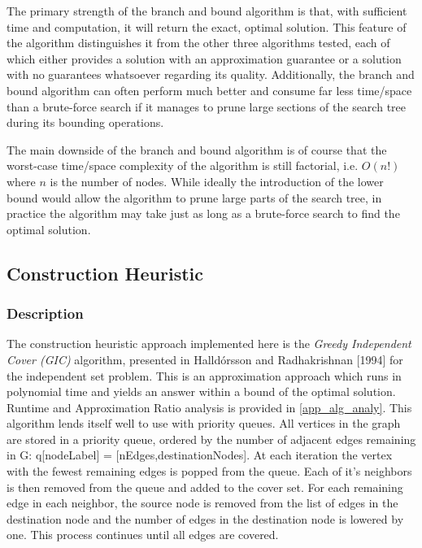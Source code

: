 \documentclass[acmlarge]{acmart}
\begin{document}

The primary strength of the branch and bound algorithm is that, with sufficient time and computation, it will return the exact, optimal solution. This feature of the algorithm distinguishes it from the other three algorithms tested, each of which either provides a solution with an approximation guarantee or a solution with no guarantees whatsoever regarding its quality. Additionally, the branch and bound algorithm can often perform much better and consume far less time/space than a brute-force search if it manages to prune large sections of the search tree during its bounding operations.

The main downside of the branch and bound algorithm is of course that the worst-case time/space complexity of the algorithm is still factorial, i.e. $O(n!)$ where $n$ is the number of nodes. While ideally the introduction of the lower bound would allow the algorithm to prune large parts of the search tree, in practice the algorithm may take just as long as a brute-force search to find the optimal solution.

\subsection{Construction Heuristic}

\subsubsection{Description}

The construction heuristic approach implemented here is the \textit{Greedy Independent Cover (GIC)} algorithm, presented in Halld\'{o}rsson and Radhakrishnan [1994] \cite{Hall97} for the independent set problem. This is an approximation approach which runs in polynomial time and yields an answer within a bound of the optimal solution. Runtime and Approximation Ratio analysis is provided in \ref{app_alg_analy}. This algorithm lends itself well to use with priority queues. All vertices in the graph are stored in a priority queue, ordered by the number of adjacent edges remaining in G: q[nodeLabel] = [nEdges,destinationNodes]. At each iteration the vertex with the fewest remaining edges is popped from the queue. Each of it's neighbors is then removed from the queue and added to the cover set. For each remaining edge in each neighbor, the source node is removed from the list of edges in the destination node and the number of edges in the destination node is lowered by one. This process continues until all edges are covered.
\end{document}
